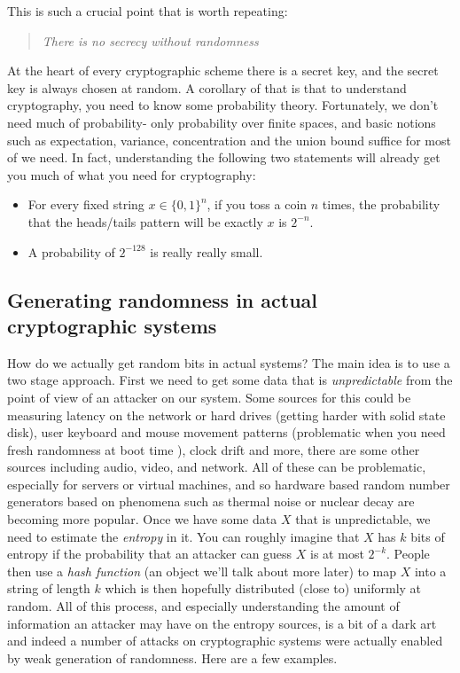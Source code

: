 This is such a crucial point that is worth repeating:

\begin{quote}
\emph{There is no secrecy without randomness}
\end{quote}

At the heart of every cryptographic scheme there is a secret key, and
the secret key is always chosen at random. A corollary of that is that
to understand cryptography, you need to know some probability theory.
Fortunately, we don't need much of probability- only probability over
finite spaces, and basic notions such as expectation, variance,
concentration and the union bound suffice for most of we need. In fact,
understanding the following two statements will already get you much of
what you need for cryptography:

\begin{itemize}
\item
  For every fixed string \(x\in\{0,1\}^n\), if you toss a coin \(n\)
  times, the probability that the heads/tails pattern will be exactly
  \(x\) is \(2^{-n}\).
\item
  A probability of \(2^{-128}\) is really really small.
\end{itemize}

\subsection{Generating randomness in actual cryptographic
systems}\label{Generating-randomness-in-actua}

How do we actually get random bits in actual systems? The main idea is
to use a two stage approach. First we need to get some data that is
\emph{unpredictable} from the point of view of an attacker on our
system. Some sources for this could be measuring latency on the network
or hard drives (getting harder with solid state disk), user keyboard and
mouse movement patterns (problematic when you need fresh randomness at
boot time ), clock drift and more, there are some other sources
including audio, video, and network. All of these can be problematic,
especially for servers or virtual machines, and so hardware based random
number generators based on phenomena such as thermal noise or nuclear
decay are becoming more popular. Once we have some data \(X\) that is
unpredictable, we need to estimate the \emph{entropy} in it. You can
roughly imagine that \(X\) has \(k\) bits of entropy if the probability
that an attacker can guess \(X\) is at most \(2^{-k}\). People then use
a \emph{hash function} (an object we'll talk about more later) to map
\(X\) into a string of length \(k\) which is then hopefully distributed
(close to) uniformly at random. All of this process, and especially
understanding the amount of information an attacker may have on the
entropy sources, is a bit of a dark art and indeed a number of attacks
on cryptographic systems were actually enabled by weak generation of
randomness. Here are a few examples.

